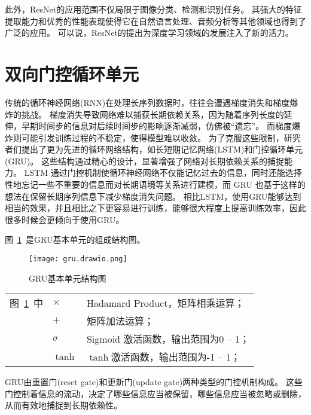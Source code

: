 此外，ResNet的应用范围不仅局限于图像分类、检测和识别任务。
其强大的特征提取能力和优秀的性能表现使得它在自然语言处理、音频分析等其他领域也得到了广泛的应用。
可以说，ResNet的提出为深度学习领域的发展注入了新的活力。

\section{双向门控循环单元}
传统的循环神经网络(RNN)在处理长序列数据时，往往会遭遇梯度消失和梯度爆炸的挑战。
梯度消失导致网络难以捕获长期依赖关系，因为随着序列长度的延伸，早期时间步的信息对后续时间步的影响逐渐减弱，仿佛被“遗忘”。
而梯度爆炸则可能引发训练过程的不稳定，使得模型难以收敛。
为了克服这些限制，研究者们提出了更为先进的循环网络结构，如长短期记忆网络(LSTM)\cite{2023Comparative}和门控循环单元(GRU)\cite{2023Short}。
这些结构通过精心的设计，显著增强了网络对长期依赖关系的捕捉能力。
LSTM 通过门控机制使循环神经网络不仅能记忆过去的信息，同时还能选择性地忘记一些不重要的信息而对长期语境等关系进行建模，而 GRU 也基于这样的想法在保留长期序列信息下减少梯度消失问题。
相比LSTM，使用GRU能够达到相当的效果，并且相比之下更容易进行训练，能够很大程度上提高训练效率，因此很多时候会更倾向于使用GRU。

图~\ref{fig:GRUunit}~是GRU基本单元的组成结构图。
\begin{figure}[h] 
  \centering
  \texttt{[image: gru.drawio.png]}
  \caption{GRU基本单元结构图}
  \label{fig:GRUunit}
\end{figure}
\begin{flushleft}
  \renewcommand\arraystretch{1.25}
  \begin{tabularx}{\textwidth}{@{}>{\normalsize\rm}l@{\quad}>{\normalsize\rm}l@{——}>{\normalsize\rm}X@{}}
  图~\ref{fig:GRUunit}~中
  &  $\times$ &Hadamard Product，矩阵相乘运算；\\
  &  $+$ &矩阵加法运算；\\
  &  $σ$ &Sigmoid 激活函数，输出范围为0 -- 1；\\
  &  $\tanh$ & $\tanh$激活函数，输出范围为-1 -- 1；\\
  \end{tabularx}\vspace{.5ex}%
\end{flushleft}

GRU由重置门(reset gate)和更新门(update gate)两种类型的门控机制构成。
这些门控制着信息的流动，决定了哪些信息应当被保留，哪些信息应当被忽略或删除，从而有效地捕捉到长期依赖性。

